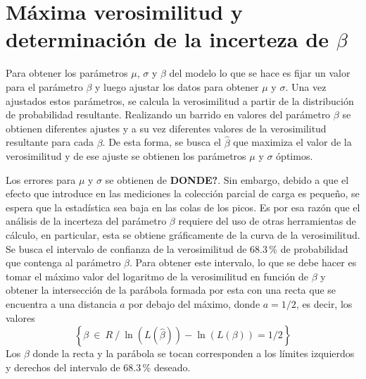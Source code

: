 \section{Máxima verosimilitud y determinación de la incerteza de \texorpdfstring{$\beta$}{beta}\label{sec:MaximaVerosimilitud}}
\noindent Para obtener los parámetros $\mu$, $\sigma$ y $\beta$ del modelo lo que se hace es fijar un valor para el parámetro $\beta$ y luego ajustar los datos para obtener $\mu$ y $\sigma$. Una vez ajustados estos parámetros, se calcula la verosimilitud a partir de la distribución de probabilidad resultante. Realizando un barrido en valores del parámetro $\beta$ se obtienen diferentes ajustes y a su vez diferentes valores de la verosimilitud resultante para cada $\beta$. De esta forma, se busca el $\hat{\beta}$ que maximiza el valor de la verosimilitud y de ese ajuste se obtienen los parámetros $\mu$ y $\sigma$ óptimos. 

Los errores para $\mu$ y $\sigma$ se obtienen de \textbf{DONDE?}. Sin embargo, debido a que el efecto que introduce en las mediciones la colección parcial de carga es pequeño, se espera que la estadística sea baja en las colas de los picos. Es por esa razón que el análisis de la incerteza del parámetro $\beta$ requiere del uso de otras herramientas de cálculo, en particular, esta se obtiene gráficamente de la curva de la verosimilitud. Se busca el intervalo de confianza de la verosimilitud de $68.3\,\%$ de probabilidad que contenga al parámetro $\beta$. Para obtener este intervalo, lo que se debe hacer es tomar el máximo valor del logaritmo de la verosimilitud en función de $\beta$ y obtener la intersección de la parábola formada por esta con una recta que se encuentra a una distancia $a$ por debajo del máximo, donde $a = 1/2$, es decir, los valores
\begin{equation*}
    \left\{
        \beta\ \in\ R\ /\ 
        \ln{(L(\hat{\beta}))}
        -
        \ln{
            \left(
                L(\beta)
            \right)
            }
        = 1/2
    \right\}
\end{equation*}
Los $\beta$ donde la recta y la parábola se tocan corresponden a los límites izquierdos y derechos del intervalo de $68.3\,\%$ deseado\cite{Frodesen}.


